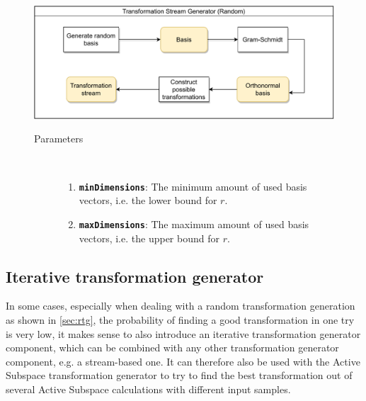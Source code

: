 \documentclass[
  a4paper,  %
  twoside,  %
  bibliography=totoc,
  headsepline,
  cleardoublepage=empty,
  parskip=half,
  draft=false
]{scrbook}
\begin{document}
\begin{figure}[H]

\includegraphics[width=\textwidth]{graphics/TransformationStreamGen_Random.pdf}

\vspace{-1.5mm}

\begin{mdframed}[linewidth=0.7px]

\begin{description}
\item[Parameters] {~ \begin{enumerate}[\indent{}]
\item \texttt{\textbf{minDimensions}}: The minimum amount of used basis vectors, i.e. the lower bound for $r$.
\item \texttt{\textbf{maxDimensions}}: The maximum amount of used basis vectors, i.e. the upper bound for $r$.
\end{enumerate}}
\end{description}

\end{mdframed}
\label{fig:rtsg}
\end{figure}

\newpage

\subsection {Iterative transformation generator}

In some cases, especially when dealing with a random transformation generation as shown in \ref{sec:rtg}, the probability of finding a good transformation in one try is very low, it makes sense to also introduce an iterative transformation generator component, which can be combined with any other transformation generator component, e.g. a stream-based one.
It can therefore also be used with the Active Subspace transformation generator to try to find the best transformation out of several Active Subspace calculations with different input samples.
\end{document}

